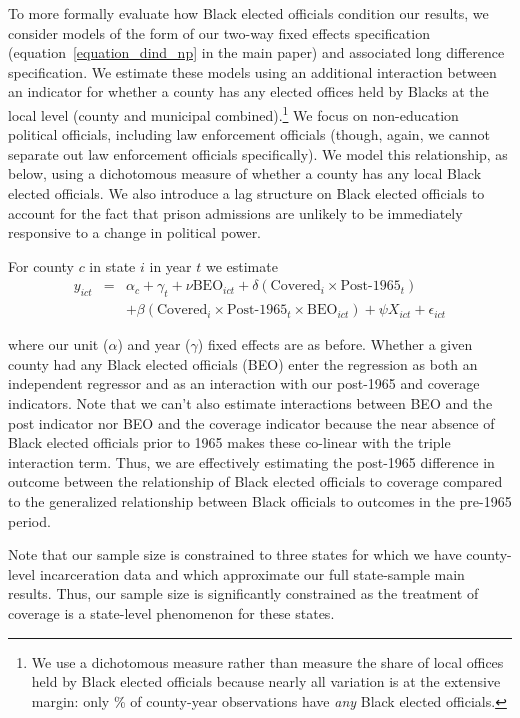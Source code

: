 \documentclass[12pt]{article}
\begin{document}
To more formally evaluate how Black elected officials condition our results, we consider models of the form of our two-way fixed effects specification (equation~\ref{equation_dind_np} in the main paper) and associated long difference specification.  We estimate these models using an additional interaction between an indicator for whether a county has any elected offices held by Blacks at the local level (county and municipal combined).\footnote{We use a dichotomous measure rather than measure the share of local offices held by Black elected officials because nearly all variation is at the extensive margin: only \unskip\% of county-year observations have \emph{any} Black elected officials.}  We focus on non-education political officials, including law enforcement officials (though, again, we cannot separate out law enforcement officials specifically). We model this relationship, as below, using a dichotomous measure of whether a county has any local Black elected officials.  We also introduce a lag structure on Black elected officials to account for the fact that prison admissions are unlikely to be immediately responsive to a change in political power.

For county $c$ in state $i$ in year $t$ we estimate \footnotesize
\begin{align}
     y_{ict} &=& \alpha_{c} + \gamma_{t} + \nu \text{BEO}_{ict} + \delta (\text{Covered}_{i} \times \text{Post-1965}_{t}) \label{equation_beo} \\
     && + \beta (\text{Covered}_{i} \times \text{Post-1965}_{t} \times \text{BEO}_{ict}) + \psi X_{ict} + \epsilon_{ict}  \nonumber
\end{align}\normalsize

where our unit ($\alpha$) and year ($\gamma$) fixed effects are as before.  Whether a given county had any Black elected officials (BEO) enter the regression as both an independent regressor and as an interaction with our post-1965 and coverage indicators. Note that we can't also estimate interactions between BEO and the post indicator nor BEO and the coverage indicator because the near absence of Black elected officials prior to 1965 makes these co-linear with the triple interaction term.  Thus, we are effectively estimating the post-1965 difference in outcome between the relationship of Black elected officials to coverage compared to the generalized relationship between Black officials to outcomes in the pre-1965 period.

Note that our sample size is constrained to three states for which we have county-level incarceration data and which approximate our full state-sample main results.  Thus, our sample size is significantly constrained as the treatment of coverage is a state-level phenomenon for these states.
\end{document}
